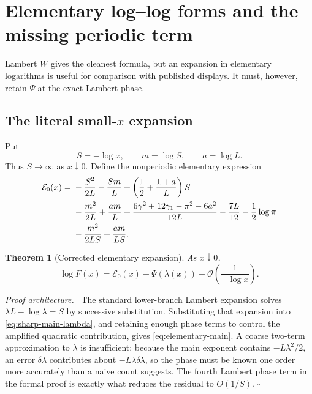 \documentclass[11pt,oneside]{article}
\newtheorem{theorem}{Theorem}[section]
\theoremstyle{definition}
\theoremstyle{remark}
\newcommand{\bigO}{\mathcal O}
\newenvironment{proofidea}{\par\smallskip\noindent\textit{Proof architecture.}\ }{\hfill$\square$\par\smallskip}
\begin{document}
\section{Elementary log--log forms and the missing periodic term}
\label{sec:elementary-asymptotic}

Lambert $W$ gives the cleanest formula, but an expansion in elementary logarithms is useful
for comparison with published displays.  It must, however, retain $\Psi$ at the exact Lambert
phase.

\subsection{The literal small-$x$ expansion}

Put
\begin{equation}
 S=-\log x,\qquad m=\log S,\qquad a=\log L.                \label{eq:S-m-a}
\end{equation}
Thus $S\to\infty$ as $x\downarrow0$.  Define the nonperiodic elementary expression
\begin{align}
 \mathcal E_0(x)
={}&-\frac{S^2}{2L}-\frac{Sm}{L}
 +\left(\frac12+\frac{1+a}{L}\right)S                     \notag\\
 &-\frac{m^2}{2L}+\frac{am}{L}
 +\frac{6\gamma^2+12\gamma_1-\pi^2-6a^2}{12L}
 -\frac{7L}{12}-\frac12\log\pi                           \notag\\
 &-\frac{m^2}{2LS}+\frac{am}{LS}.                         \label{eq:elementary-main}
\end{align}

\begin{theorem}[Corrected elementary expansion]
As $x\downarrow0$,
\begin{equation}
 \boxed{
 \log F(x)=\mathcal E_0(x)+\Psi(\lambda(x))
 +\bigO\!\left(\frac1{-\log x}\right).}                  \label{eq:corrected-elementary}
\end{equation}
\end{theorem}

\begin{proofidea}
The standard lower-branch Lambert expansion solves
$\lambda L-\log\lambda=S$ by successive substitution.  Substituting that expansion into
\eqref{eq:sharp-main-lambda}, and retaining enough phase terms to control the amplified
quadratic contribution, gives \eqref{eq:elementary-main}.  A coarse two-term approximation to
$\lambda$ is insufficient: because the main exponent contains $-L\lambda^2/2$, an error
$\delta\lambda$ contributes about $-L\lambda\delta\lambda$, so the phase must be known one
order more accurately than a naive count suggests.  The fourth Lambert phase term in the
formal proof is exactly what reduces the residual to $O(1/S)$.
\end{proofidea}
\end{document}
